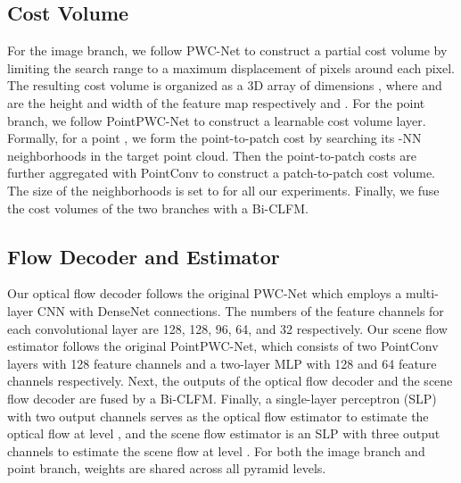 \documentclass[10pt,twocolumn,letterpaper]{article}
\begin{document}
\subsection{Cost Volume} For the image branch, we follow PWC-Net to construct a partial cost volume by limiting the search range to a maximum displacement of  pixels around each pixel. The resulting cost volume is organized as a 3D array of dimensions , where  and  are the height and width of the feature map respectively and . For the point branch, we follow PointPWC-Net to construct a learnable cost volume layer. Formally, for a point , we form the point-to-patch cost by searching its -NN neighborhoods in the target point cloud. Then the point-to-patch costs are further aggregated with PointConv to construct a patch-to-patch cost volume. The size of the neighborhoods is set to  for all our experiments. Finally, we fuse the cost volumes of the two branches with a Bi-CLFM.

\subsection{Flow Decoder and Estimator} Our optical flow decoder follows the original PWC-Net which employs a multi-layer CNN with DenseNet \cite{huang2017densenet} connections. The numbers of the feature channels for each convolutional layer are 128, 128, 96, 64, and 32 respectively. Our scene flow estimator follows the original PointPWC-Net, which consists of two PointConv layers with 128 feature channels and a two-layer MLP with 128 and 64 feature channels respectively. Next, the outputs of the optical flow decoder and the scene flow decoder are fused by a Bi-CLFM. Finally, a single-layer perceptron (SLP) with two output channels serves as the optical flow estimator to estimate the optical flow at level , and the scene flow estimator is an SLP with three output channels to estimate the scene flow at level . For both the image branch and point branch, weights are shared across all pyramid levels.
\end{document}
